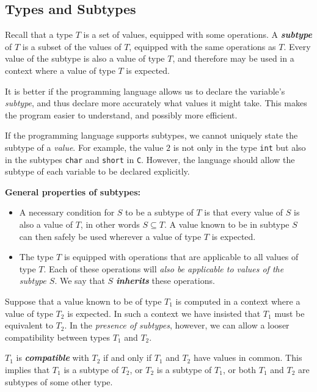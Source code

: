 \subsection{Types and Subtypes}
\label{subsec:types-subtypes}

Recall that a type $T$ is a set of values, equipped with some operations. A \textit{\textbf{subtype}} of $T$ is a subset of the values of $T$, equipped with the same operations as $T$. Every value of the subtype is also a value of type $T$, and therefore may be used in a context where a value of type $T$ is expected.

It is better if the programming language allows us to declare the variable's \textit{subtype}, and thus declare more accurately what values it might take. This makes the program easier to understand, and possibly more efficient.

\vspace*{\fill}
\columnbreak

If the programming language supports subtypes, we cannot uniquely state the subtype of a \textit{value}. For example, the value $2$ is not only in the type \texttt{int} but also in the subtypes \texttt{char} and \texttt{short} in \texttt{C}. However, the language should allow the subtype of each variable to be declared explicitly.

\noindent \textbf{General properties of subtypes:}
\begin{itemize}
  \item A necessary condition for $S$ to be a subtype of $T$ is that every value of $S$ is also a value of $T$, in other
  words $S \subseteq T$. A value known to be in subtype $S$ can then safely be used wherever a value of type $T$ is expected.
  \item The type $T$ is equipped with operations that are applicable to all values of type $T$. Each of these operations will \textit{also be applicable to values of the subtype $S$}. We say that $S$ \textit{\textbf{inherits}} these operations.
\end{itemize}

Suppose that a value known to be of type $T_1$ is computed in a context where a value of type $T_2$ is expected. In such a context we have insisted that $T_1$ must be equivalent to $T_2$. In the \textit{presence of subtypes}, however, we can allow a looser compatibility between types $T_1$ and $T_2$.

$T_1$ is \textit{\textbf{compatible}} with $T_2$ if and only if $T_1$ and $T_2$ have values in common. This implies that $T_1$ is a subtype of $T_2$, or $T_2$ is a subtype of $T_1$, or both $T_1$ and $T_2$ are subtypes of some other type.

